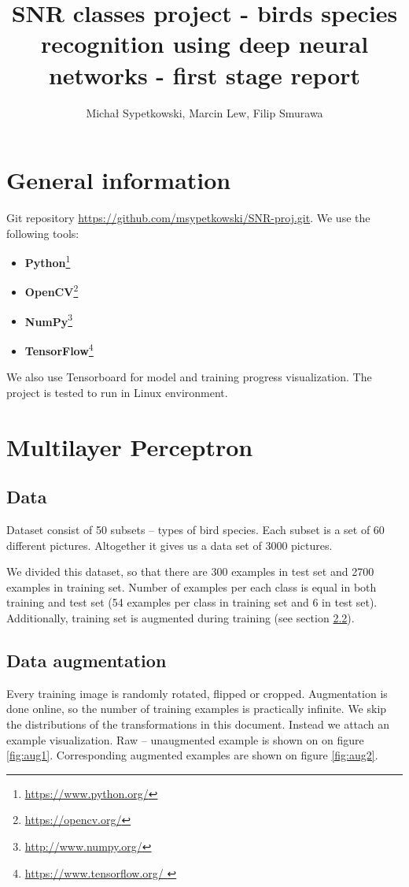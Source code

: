 \documentclass[a4paper]{article}
\begin{document}
\title{SNR classes project - birds species recognition using deep neural networks
- first stage report}

\author{Michał Sypetkowski, Marcin Lew, Filip Smurawa}
\maketitle

\section{General information}
Git repository \url{https://github.com/msypetkowski/SNR-proj.git}.
We use the following tools:
\begin{itemize}
    \item \textbf{Python}\footnote{\url{https://www.python.org/}}
    \item \textbf{OpenCV}\footnote{\url{https://opencv.org/}}
    \item \textbf{NumPy}\footnote{\url{http://www.numpy.org/}}
    \item \textbf{TensorFlow}\footnote{\url{https://www.tensorflow.org/ }}
\end{itemize}
We also use Tensorboard for model and training progress visualization.
The project is tested to run in Linux environment.

\section{Multilayer Perceptron}

\subsection{Data}
Dataset consist of 50 subsets -- types of bird species.
Each subset is a set of 60 different pictures.
Altogether it gives us a data set of 3000 pictures.

We divided this dataset, so that there are 300 examples in test set and
2700 examples in training set.
Number of examples per each class is equal in both training and test set
(54 examples per class in training set and 6 in test set).
Additionally, training set is augmented during training (see section \ref{augmentation}).


\subsection{Data augmentation}
\label{augmentation}
Every training image is randomly rotated, flipped or cropped.
Augmentation is done online, so the number of training examples is
practically infinite.
We skip the distributions of the transformations in this document.
Instead we attach an example visualization.
Raw -- unaugmented example is shown on on figure \ref{fig:aug1}.
Corresponding augmented examples are shown on figure \ref{fig:aug2}.
\end{document}
